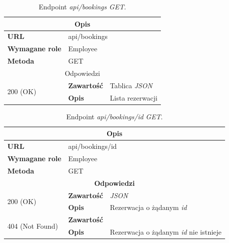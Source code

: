 \documentclass[eng,printmode,openany]{mgr}
\begin{document}
\begin{table}[H]
	\caption{Endpoint \textit{api/bookings GET}.}
	\begin{tabularx}{\textwidth}{|l|l|X|}
		\hline
		\multicolumn{3}{|c|}{\textbf{\textbf{Opis}}}
		\\ \hline
		\textbf{URL}                         & \multicolumn{2}{l|}{api/bookings}
		\\ \hline
		\textbf{Wymagane role}               & \multicolumn{2}{l|}{Employee}
		\\ \hline
		\textbf{Metoda}                      & \multicolumn{2}{l|}{GET}
		\\ \hline
		\multicolumn{3}{|c|}{ Odpowiedzi}
		\\ \hline
		\multirow{2}{*}{200 (OK)}   & \textbf{Zawartość}         & Tablica \textit{JSON}
		\\ \cline{2-3}              & \textbf{Opis}         	    & Lista rezerwacji
		\\ \hline
	\end{tabularx}
\end{table}

\begin{table}[H]
	\caption{Endpoint \textit{api/bookings/id GET}.}
	\begin{tabularx}{\textwidth}{|l|l|X|}
		\hline
		\multicolumn{3}{|c|}{\textbf{\textbf{Opis}}}
		\\ \hline
		\textbf{URL}                         & \multicolumn{2}{l|}{api/bookings/id}
		\\ \hline
		\textbf{Wymagane role}               & \multicolumn{2}{l|}{Employee}
		\\ \hline
		\textbf{Metoda}                      & \multicolumn{2}{l|}{GET}
		\\ \hline
		\multicolumn{3}{|c|}{\textbf{Odpowiedzi}}
		\\ \hline
		\multirow{2}{*}{200 (OK)} 	        & \textbf{Zawartość}   	& \textit{JSON}
		\\ \cline{2-3}                      & \textbf{Opis}         	& Rezerwacja o żądanym \textit{id}
		\\ \hline
		\multirow{2}{*}{404 (Not Found)} 	& \textbf{Zawartość}     & 
		\\ \cline{2-3}                      & \textbf{Opis}          & Rezerwacja o żądanym \textit{id} nie istnieje
		\\ \hline
	\end{tabularx}
\end{table}
\end{document}
